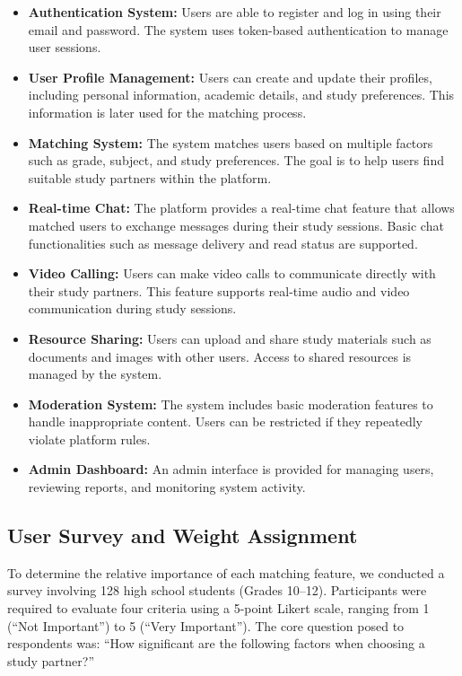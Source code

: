 \documentclass[a4paper,12pt]{report}
\begin{document}
\begin{itemize}
    \item \textbf{Authentication System:} Users are able to register and log in using their email and password. The system uses token-based authentication to manage user sessions.
    
    \item \textbf{User Profile Management:} Users can create and update their profiles, including personal information, academic details, and study preferences. This information is later used for the matching process.
    
    \item \textbf{Matching System:} The system matches users based on multiple factors such as grade, subject, and study preferences. The goal is to help users find suitable study partners within the platform.
    
    \item \textbf{Real-time Chat:} The platform provides a real-time chat feature that allows matched users to exchange messages during their study sessions. Basic chat functionalities such as message delivery and read status are supported.
    
    \item \textbf{Video Calling:} Users can make video calls to communicate directly with their study partners. This feature supports real-time audio and video communication during study sessions.
    
    \item \textbf{Resource Sharing:} Users can upload and share study materials such as documents and images with other users. Access to shared resources is managed by the system.
    
    \item \textbf{Moderation System:} The system includes basic moderation features to handle inappropriate content. Users can be restricted if they repeatedly violate platform rules.
    
    \item \textbf{Admin Dashboard:} An admin interface is provided for managing users, reviewing reports, and monitoring system activity.
\end{itemize}

\subsection{User Survey and Weight Assignment}

To determine the relative importance of each matching feature, we conducted a survey involving 128 high school students (Grades 10--12). Participants were required to evaluate four criteria using a 5-point Likert scale, ranging from 1 (``Not Important'') to 5 (``Very Important''). The core question posed to respondents was: ``How significant are the following factors when choosing a study partner?''
\end{document}
